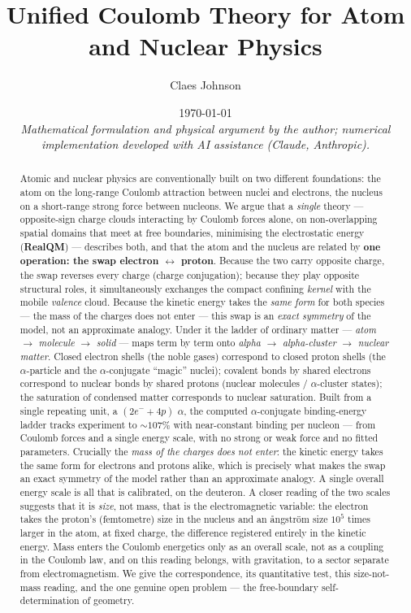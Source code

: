 \documentclass[11pt]{article}
\title{Unified Coulomb Theory for Atom and Nuclear Physics}
\author[1]{Claes Johnson}
\affil[1]{KTH Royal Institute of Technology, SE-100 44 Stockholm, Sweden \\
\texttt{claesjohnson@gmail.com}}
\date{\today \\[0.4em]
\small\textit{Mathematical formulation and physical argument by the author; numerical} \\
\small\textit{implementation developed with AI assistance (Claude, Anthropic).}}
\begin{document}
\maketitle

\begin{abstract}
Atomic and nuclear physics are conventionally built on two different foundations: the atom on the
long-range Coulomb attraction between nuclei and electrons, the nucleus on a short-range strong force
between nucleons. We argue that a \emph{single} theory --- opposite-sign charge clouds interacting by
Coulomb forces alone, on non-overlapping spatial domains that meet at free boundaries, minimising the
electrostatic energy (\textbf{RealQM}) --- describes both, and that the atom and the nucleus are
related by \textbf{one operation: the swap electron $\leftrightarrow$ proton}. Because the two carry
opposite charge, the swap reverses every charge (charge conjugation); because they play opposite
structural roles, it simultaneously exchanges the compact confining \emph{kernel} with the mobile
\emph{valence} cloud. Because the kinetic energy takes the \emph{same form} for both species --- the mass of the charges
does not enter --- this swap is an \emph{exact symmetry} of the model, not an approximate analogy.
Under it the ladder of ordinary matter --- \emph{atom $\to$ molecule
$\to$ solid} --- maps term by term onto \emph{alpha $\to$ alpha-cluster $\to$ nuclear matter}. Closed
electron shells (the noble gases) correspond to closed proton shells (the $\alpha$-particle and the
$\alpha$-conjugate ``magic'' nuclei); covalent bonds by shared electrons correspond to nuclear bonds
by shared protons (nuclear molecules / $\alpha$-cluster states); the saturation of condensed matter
corresponds to nuclear saturation. Built from a single repeating unit, a $(2e^- + 4p)$ $\alpha$, the
computed $\alpha$-conjugate binding-energy ladder tracks experiment to $\sim\!107\%$ with
near-constant binding per nucleon --- from Coulomb forces and a single energy scale, with no strong or
weak force and no fitted parameters. Crucially the \emph{mass of the charges does not enter}: the
kinetic energy takes the same form for electrons and protons alike, which is precisely what makes the
swap an exact symmetry of the model rather than an approximate analogy. A single overall energy scale
is all that is calibrated, on the deuteron. A closer reading of the two scales suggests that it is
\emph{size}, not mass, that is the electromagnetic variable: the electron takes the proton's
(femtometre) size in the nucleus and an {\aa}ngstr\"om size $10^5$ times larger in the atom, at fixed
charge, the difference registered entirely in the kinetic energy. Mass enters the Coulomb energetics
only as an overall scale, not as a coupling in the Coulomb law, and on this reading belongs, with
gravitation, to a sector separate from electromagnetism. We give the correspondence, its quantitative
test, this size-not-mass reading, and the one genuine open
problem --- the free-boundary self-determination of geometry.


\end{abstract}
\end{document}

